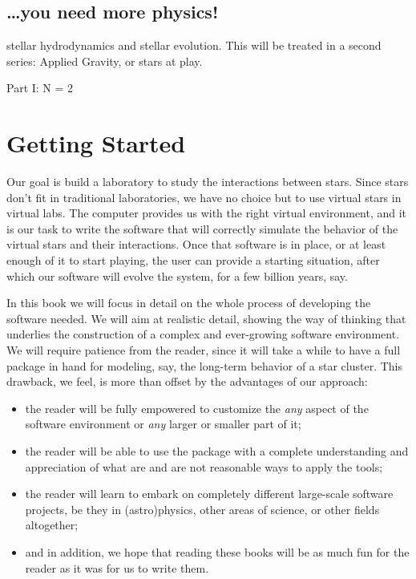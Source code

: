 \documentclass{book}
\begin{document}
\subsection{\dots you need more physics!}

stellar hydrodynamics and stellar evolution.  This will be treated in
a second series: Applied Gravity, or stars at play.

\newpage

\begin{center}
{\lggb Part I: N = 2}
\end{center}

\bigskip
\bigskip

\section{Getting Started}

Our goal is build a laboratory to study the interactions between stars.
Since stars don't fit in traditional laboratories, we have no choice
but to use virtual stars in virtual labs.  The computer provides us
with the right virtual environment, and it is our task to write the
software that will correctly simulate the behavior of the virtual stars
and their interactions.  Once that software is in place, or at least
enough of it to start playing, the user can provide a starting situation,
after which our software will evolve the system, for a few billion years,
say.

In this book we will focus in detail on the whole process of developing
the software needed.  We will aim at realistic detail, showing the way
of thinking that underlies the construction of a complex and ever-growing
software environment.  We will require patience from the reader, since it
will take a while to have a full package in hand for modeling, say,
the long-term behavior of a star cluster.  This drawback, we feel, is
more than offset by the advantages of our approach:

\begin{itemize}
\item
the reader will be fully empowered to customize the {\it any}
aspect of the software environment or {\it any} larger or smaller part of it;
\item
the reader will be able to use the package with a complete
understanding and appreciation of what are and are not reasonable ways
to apply the tools;
\item
the reader will learn to embark on completely different large-scale
software projects, be they in (astro)physics, other areas of science,
or other fields altogether; 
\item
and in addition, we hope that reading these books will be as much fun
for the reader as it was for us to write them.
\end{itemize}
\end{document}
